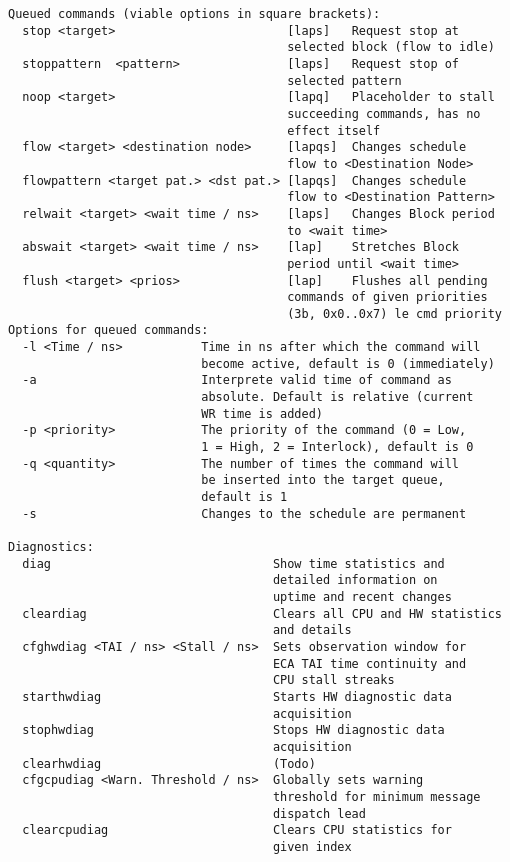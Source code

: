 \begin{lstlisting}[style = helptext]
Queued commands (viable options in square brackets):
  stop <target>                        [laps]   Request stop at 
                                       selected block (flow to idle)
  stoppattern  <pattern>               [laps]   Request stop of 
                                       selected pattern
  noop <target>                        [lapq]   Placeholder to stall
                                       succeeding commands, has no 
                                       effect itself
  flow <target> <destination node>     [lapqs]  Changes schedule 
                                       flow to <Destination Node>
  flowpattern <target pat.> <dst pat.> [lapqs]  Changes schedule 
                                       flow to <Destination Pattern>
  relwait <target> <wait time / ns>    [laps]   Changes Block period
                                       to <wait time>
  abswait <target> <wait time / ns>    [lap]    Stretches Block 
                                       period until <wait time>
  flush <target> <prios>               [lap]    Flushes all pending
                                       commands of given priorities 
                                       (3b, 0x0..0x7) le cmd priority
Options for queued commands:
  -l <Time / ns>           Time in ns after which the command will
                           become active, default is 0 (immediately)
  -a                       Interprete valid time of command as 
                           absolute. Default is relative (current 
                           WR time is added)
  -p <priority>            The priority of the command (0 = Low, 
                           1 = High, 2 = Interlock), default is 0
  -q <quantity>            The number of times the command will 
                           be inserted into the target queue, 
                           default is 1
  -s                       Changes to the schedule are permanent

Diagnostics:
  diag                               Show time statistics and 
                                     detailed information on 
                                     uptime and recent changes
  cleardiag                          Clears all CPU and HW statistics 
                                     and details 
  cfghwdiag <TAI / ns> <Stall / ns>  Sets observation window for 
                                     ECA TAI time continuity and 
                                     CPU stall streaks
  starthwdiag                        Starts HW diagnostic data 
                                     acquisition
  stophwdiag                         Stops HW diagnostic data
                                     acquisition
  clearhwdiag                        (Todo)
  cfgcpudiag <Warn. Threshold / ns>  Globally sets warning 
                                     threshold for minimum message
                                     dispatch lead
  clearcpudiag                       Clears CPU statistics for 
                                     given index
\end{lstlisting}

